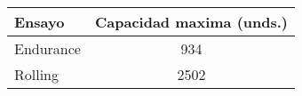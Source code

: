 \documentclass[varwidth=\maxdimen]{standalone}
\begin{document}
\begin{tabular}{ l c }
	\toprule
	Ensayo & Capacidad maxima (unds.) \\
	\midrule
	Endurance	& 934 \\
	Rolling		& 2502 \\
	\bottomrule
\end{tabular}
\end{document}
